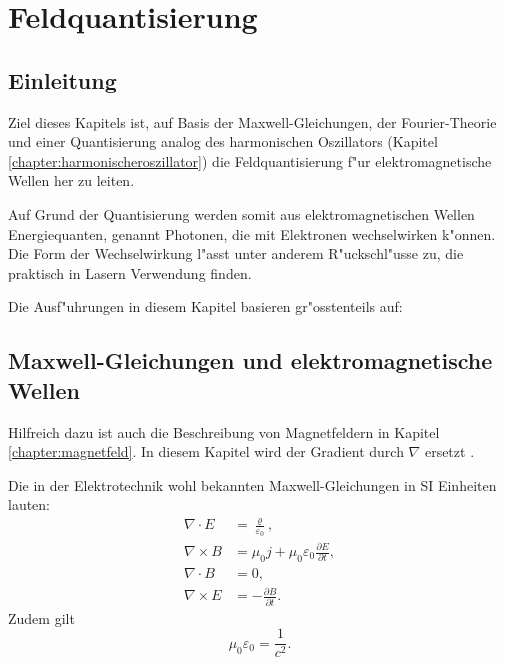 \chapter{Feldquantisierung\label{chapter:feldquantisierung}}
\begin{refsection}

\printbibliography[heading=subbibliography]
\end{refsection}

\section{Einleitung}

Ziel dieses Kapitels ist, auf Basis der Maxwell-Gleichungen, der Fourier-Theorie und einer Quantisierung analog des harmonischen Oszillators (Kapitel \ref{chapter:harmonischeroszillator}) die Feldquantisierung f"ur elektromagnetische Wellen her zu leiten.

Auf Grund der Quantisierung werden somit aus elektromagnetischen Wellen Energiequanten, genannt Photonen, die mit Elektronen wechselwirken k"onnen. Die Form der Wechselwirkung l"asst unter anderem R"uckschl"usse zu, die praktisch in Lasern Verwendung finden.

Die Ausf"uhrungen in diesem Kapitel basieren gr"osstenteils auf: \cite{fq:aqm}

\section{Maxwell-Gleichungen und elektromagnetische Wellen}

Hilfreich dazu ist auch die Beschreibung von Magnetfeldern in Kapitel \ref{chapter:magnetfeld}. In diesem Kapitel wird der Gradient durch $\nabla$ ersetzt \cite{fq:nabla}.

Die in der Elektrotechnik wohl bekannten Maxwell-Gleichungen in SI Einheiten lauten:
\begin{align}
\nabla\cdot E &= \frac{\varrho}{\varepsilon_0} \label{fq:maxwell_1},\\
\nabla\times B &= \mu_0 j  + \mu_0 \varepsilon_0\frac{\partial E}{\partial t} \label{fq:maxwell_2},\\
\nabla\cdot B &=0 \label{fq:maxwell_3},\\
\nabla\times E &= -\frac{\partial B }{\partial t} \label{fq:maxwell_4}.
\end{align}
Zudem gilt
\begin{equation*}
\mu_0\varepsilon_0=\frac{1}{c^2}.
\end{equation*}

